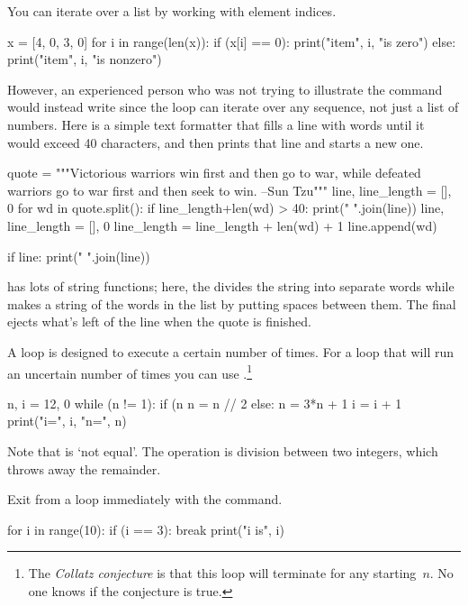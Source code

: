 You can iterate over a list by working with element indices.
\begin{pythonconsole}
x = [4, 0, 3, 0]
for i in range(len(x)):
    if (x[i] == 0):
        print("item", i, "is zero")
    else:
        print("item", i, "is nonzero")

\end{pythonconsole}
\noindent
However, an experienced  \python{} person who was not trying to illustrate 
the  command
would instead write  since
the  loop can iterate over any sequence, not just
a list of numbers.
Here is a simple text formatter that fills a line with words until
it would exceed 40 characters, and then
prints that line and starts a new one.
\begin{pythonconsole}
quote = """Victorious warriors win first and then go to war, 
while defeated warriors go to war first and then seek to win. 
--Sun Tzu"""
line, line_length = [], 0
for wd in quote.split():
    if line_length+len(wd) > 40:
        print(" ".join(line))
        line, line_length = [], 0
    line_length = line_length + len(wd) + 1
    line.append(wd)

if line:
    print(" ".join(line))

\end{pythonconsole}
\python{} has lots of string functions; here,
the  divides the string into separate words while
 makes a string of the words in the list 
 by putting spaces between them.
The final  ejects what's left of the line
when the quote is finished.

A  loop is designed to execute a certain
number of times.
For a loop that will run an uncertain number of times
you can use .\footnote{The 
\protect\textit{Collatz conjecture} is 
that this loop will 
terminate for any starting~$n$.
No one knows if the conjecture is true.}
\begin{pythonconsole}
n, i = 12, 0
while (n != 1):
    if (n %
        n = n // 2
    else:
        n = 3*n + 1
    i = i + 1
    print("i=", i, "n=", n)

\end{pythonconsole}
\noindent
Note that  \inlinecode{!=} is `not equal'. 
The \inlinecode{//} operation is division between two integers, which
throws away the remainder.

Exit from a loop immediately with the  command.
\begin{pythonconsole}
for i in range(10):
    if (i == 3):
        break
    print("i is", i)

\end{pythonconsole}

